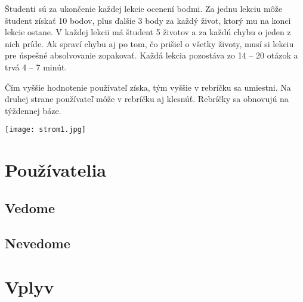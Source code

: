 \documentclass[10pt,twoside,slovak,a4paper]{article}
\begin{document}
Študenti sú za ukončenie každej lekcie ocenení bodmi. Za jednu lekciu môže študent získať 10 bodov, plus ďalšie 3 body za každý život, ktorý mu na konci lekcie ostane. V každej lekcii má študent 5 životov a za každú chybu o jeden z nich príde. Ak spraví chybu aj po tom, čo prišiel o všetky životy, musí si lekciu pre úspešné absolvovanie zopakovať. Každá lekcia pozostáva zo 14 – 20 otázok a trvá 4 – 7 minút. \cite{Duolingo} 

Čím vyššie hodnotenie používateľ získa, tým vyššie v rebríčku sa umiestni. Na druhej strane používateľ môže v rebríčku aj klesnúť. Rebríčky sa obnovujú na týždennej báze.\cite{HadiMogavi2022}


\texttt{[image: strom1.jpg]} %





\section{Používatelia} \label{Používatelia}

\subsection{Vedome} \label{Vedome}

\subsection{Nevedome} \label{Nevedome}
%



\section{Vplyv} \label{Vplyv}
\end{document}
